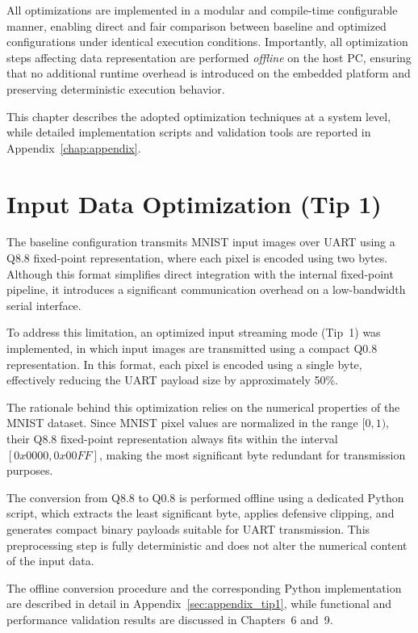 All optimizations are implemented in a modular and compile-time configurable
manner, enabling direct and fair comparison between baseline and optimized
configurations under identical execution conditions.
Importantly, all optimization steps affecting data representation are performed
\emph{offline} on the host PC, ensuring that no additional runtime overhead is
introduced on the embedded platform and preserving deterministic execution
behavior.

This chapter describes the adopted optimization techniques at a system level,
while detailed implementation scripts and validation tools are reported in
Appendix~\ref{chap:appendix}.

\section{Input Data Optimization (Tip 1)}

The baseline configuration transmits MNIST input images over UART using a Q8.8
fixed-point representation, where each pixel is encoded using two bytes.
Although this format simplifies direct integration with the internal fixed-point
pipeline, it introduces a significant communication overhead on a low-bandwidth
serial interface.

To address this limitation, an optimized input streaming mode (Tip~1) was
implemented, in which input images are transmitted using a compact Q0.8
representation.
In this format, each pixel is encoded using a single byte, effectively reducing
the UART payload size by approximately 50\%.

The rationale behind this optimization relies on the numerical properties of the
MNIST dataset.
Since MNIST pixel values are normalized in the range \([0,1)\), their Q8.8
fixed-point representation always fits within the interval \([0x0000, 0x00FF]\),
making the most significant byte redundant for transmission purposes.

The conversion from Q8.8 to Q0.8 is performed offline using a dedicated Python
script, which extracts the least significant byte, applies defensive clipping,
and generates compact binary payloads suitable for UART transmission.
This preprocessing step is fully deterministic and does not alter the numerical
content of the input data.

The offline conversion procedure and the corresponding Python implementation are
described in detail in Appendix~\ref{sec:appendix_tip1}, while functional and
performance validation results are discussed in Chapters~6 and~9.

